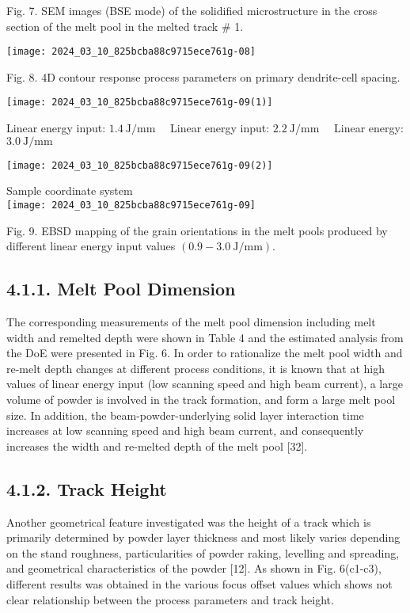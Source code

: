 \documentclass[10pt]{article}
\begin{document}
Fig. 7. SEM images (BSE mode) of the solidified microstructure in the cross section of the melt pool in the melted track \# 1.

\begin{center}
\texttt{[image: 2024\_03\_10\_825bcba88c9715ece761g-08]}
\end{center}

Fig. 8. 4D contour response process parameters on primary dendrite-cell spacing.

\begin{center}
\texttt{[image: 2024\_03\_10\_825bcba88c9715ece761g-09(1)]}
\end{center}

Linear energy input: $1.4 \mathrm{~J} / \mathrm{mm} \quad$ Linear energy input: $2.2 \mathrm{~J} / \mathrm{mm} \quad$ Linear energy: $3.0 \mathrm{~J} / \mathrm{mm}$

\begin{center}
\texttt{[image: 2024\_03\_10\_825bcba88c9715ece761g-09(2)]}
\end{center}

Sample coordinate system\\
\texttt{[image: 2024\_03\_10\_825bcba88c9715ece761g-09]}

Fig. 9. EBSD mapping of the grain orientations in the melt pools produced by different linear energy input values $(0.9-3.0 \mathrm{~J} / \mathrm{mm})$.

\subsection*{4.1.1. Melt Pool Dimension}
The corresponding measurements of the melt pool dimension including melt width and remelted depth were shown in Table 4 and the estimated analysis from the DoE were presented in Fig. 6. In order to rationalize the melt pool width and re-melt depth changes at different process conditions, it is known that at high values of linear energy input (low scanning speed and high beam current), a large volume of powder is involved in the track formation, and form a large melt pool size. In addition, the beam-powder-underlying solid layer interaction time increases at low scanning speed and high beam current, and consequently increases the width and re-melted depth of the melt pool [32].

\subsection*{4.1.2. Track Height}
Another geometrical feature investigated was the height of a track which is primarily determined by powder layer thickness and most likely varies depending on the stand roughness, particularities of powder raking, levelling and spreading, and geometrical characteristics of the powder [12]. As shown in Fig. 6(c1-c3), different results was obtained in the various focus offset values which shows not clear relationship between the process parameters and track height.
\end{document}
